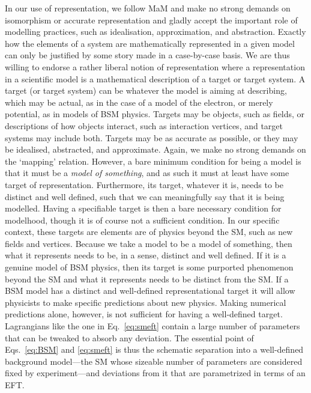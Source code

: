 In our use of representation, we follow MaM and make no strong demands on isomorphism or accurate representation and gladly accept the important role of modelling practices, such as idealisation, approximation, and abstraction. 
Exactly how the elements of a system are mathematically represented in a given model can only be justified by some story made in a case-by-case basis. We are thus willing to endorse a rather liberal notion of representation where a representation in a scientific model is a mathematical description of a target or target system. A target (or target system) can be whatever the model is aiming at describing, which may be actual, as in the case of a model of the electron, or merely potential, as in models of BSM physics. Targets may be objects, such as fields, or descriptions of how objects interact, such as interaction vertices, and target systems may include both. Targets may be as accurate as possible, or they may be idealised, abstracted, and approximate. Again, we make no strong demands on the `mapping' relation. However, a bare minimum condition for being a model is that it must be a \textit{model of something}, and as such it must at least have some target of representation. Furthermore, its target, whatever it is, needs to be distinct and well defined, such that we can meaningfully say that it is being modelled. Having a specifiable target is then a bare necessary condition for modelhood, though it is of course not a sufficient condition.
In our specific context, these targets are elements are of physics beyond the SM, such as new fields and vertices.
Because we take a model to be a model of something, then what it represents needs to be, in a sense, distinct and well defined. 
If it is a genuine model of BSM physics, then its target is some purported phenomenon beyond the SM and what it represents needs to be distinct from the SM. 
If a BSM model has a distinct and well-defined representational target it will allow physicists to make specific predictions about new physics.
Making numerical predictions alone, however, is not sufficient for having a well-defined target. 
Lagrangians like the one in Eq.~\ref{eq:smeft} contain a large number of parameters that can be tweaked to absorb any deviation. 
The essential point of Eqs.~\ref{eq:BSM} and \ref{eq:smeft} is thus the schematic separation into a well-defined background model---the SM whose sizeable number of parameters are considered fixed by experiment---and deviations from it that are parametrized in terms of an EFT.

